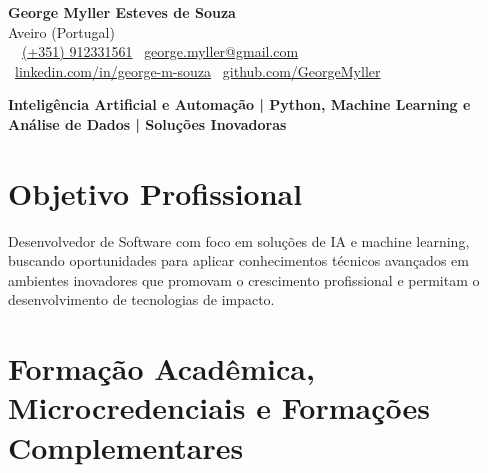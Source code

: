 \documentclass[11pt]{article}
\begin{document}
\begin{center}
    {\Huge \textbf{George Myller Esteves de Souza}} \\[1.5ex] %
    Aveiro (Portugal) \\[1.0ex] %
    \faPhone\ \faWhatsapp\ \href{tel:+351912331561}{(+351) 912331561} \quad %
    \faEnvelope\ \href{mailto:george.myller@gmail.com}{george.myller@gmail.com} \\ %
    \faLinkedinSquare\ \href{https://www.linkedin.com/in/george-m-souza/}{linkedin.com/in/george-m-souza} \quad %
    \faGithub\ \href{https://github.com/GeorgeMyller}{github.com/GeorgeMyller} %
\end{center}

\vspace{1em} %

\begin{center} %
\textbf{Inteligência Artificial e Automação | Python, Machine Learning e Análise de Dados | Soluções Inovadoras}
\end{center}

\vspace{0.4em} %

\section*{Objetivo Profissional}
Desenvolvedor de Software com foco em soluções de IA e machine learning, buscando oportunidades para aplicar conhecimentos técnicos avançados em ambientes inovadores que promovam o crescimento profissional e permitam o desenvolvimento de tecnologias de impacto.


\section*{Formação Acadêmica, Microcredenciais e Formações Complementares}
\end{document}
